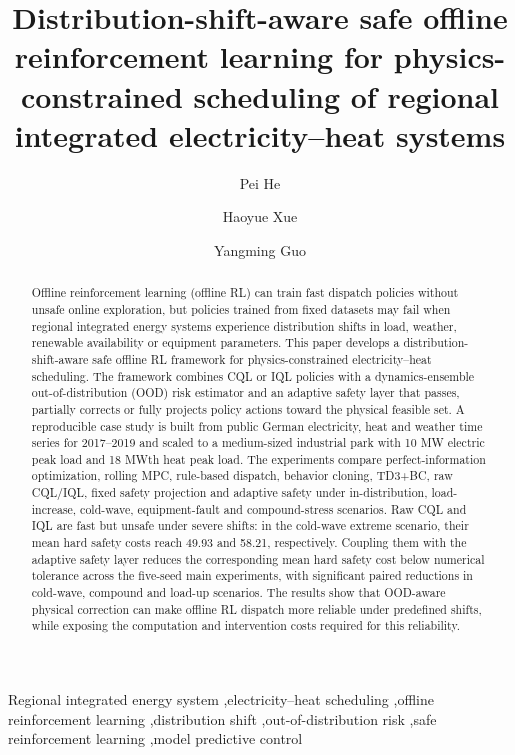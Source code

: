\documentclass[preprint,12pt]{elsarticle}
\def\corref#1{}%
\begin{document}
\begin{frontmatter}

\title{Distribution-shift-aware safe offline reinforcement learning for physics-constrained scheduling of regional integrated electricity--heat systems}

\author[a]{Pei He}

\author[b]{Haoyue Xue}

\author[c]{Yangming Guo\corref{cor1}}

\address[a]{School of Computer Science and Engineering, Northwestern Polytechnical University, Xi'an, Shaanxi 710072, China}
\address[b]{College of Agricultural, Consumer and Environmental Sciences, University of Illinois Urbana-Champaign, Urbana, IL 61801, USA}
\address[c]{School of Cybersecurity, Northwestern Polytechnical University, Xi'an 710072, China}

\begin{abstract}
Offline reinforcement learning (offline RL) can train fast dispatch policies without unsafe online exploration, but policies trained from fixed datasets may fail when regional integrated energy systems experience distribution shifts in load, weather, renewable availability or equipment parameters. This paper develops a distribution-shift-aware safe offline RL framework for physics-constrained electricity--heat scheduling. The framework combines CQL or IQL policies with a dynamics-ensemble out-of-distribution (OOD) risk estimator and an adaptive safety layer that passes, partially corrects or fully projects policy actions toward the physical feasible set. A reproducible case study is built from public German electricity, heat and weather time series for 2017--2019 and scaled to a medium-sized industrial park with 10 MW electric peak load and 18 MWth heat peak load. The experiments compare perfect-information optimization, rolling MPC, rule-based dispatch, behavior cloning, TD3+BC, raw CQL/IQL, fixed safety projection and adaptive safety under in-distribution, load-increase, cold-wave, equipment-fault and compound-stress scenarios. Raw CQL and IQL are fast but unsafe under severe shifts: in the cold-wave extreme scenario, their mean hard safety costs reach 49.93 and 58.21, respectively. Coupling them with the adaptive safety layer reduces the corresponding mean hard safety cost below numerical tolerance across the five-seed main experiments, with significant paired reductions in cold-wave, compound and load-up scenarios. The results show that OOD-aware physical correction can make offline RL dispatch more reliable under predefined shifts, while exposing the computation and intervention costs required for this reliability.
\end{abstract}

\begin{keyword}
Regional integrated energy system \sep electricity--heat scheduling \sep offline reinforcement learning \sep distribution shift \sep out-of-distribution risk \sep safe reinforcement learning \sep model predictive control
\end{keyword}

\end{frontmatter}
\end{document}
